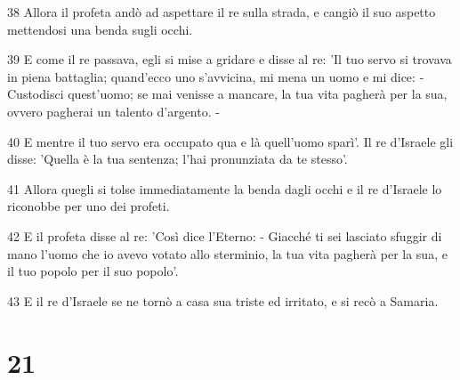 \par 38 Allora il profeta andò ad aspettare il re sulla strada, e cangiò il suo aspetto mettendosi una benda sugli occhi.
\par 39 E come il re passava, egli si mise a gridare e disse al re: 'Il tuo servo si trovava in piena battaglia; quand'ecco uno s'avvicina, mi mena un uomo e mi dice: - Custodisci quest'uomo; se mai venisse a mancare, la tua vita pagherà per la sua, ovvero pagherai un talento d'argento. -
\par 40 E mentre il tuo servo era occupato qua e là quell'uomo sparì'. Il re d'Israele gli disse: 'Quella è la tua sentenza; l'hai pronunziata da te stesso'.
\par 41 Allora quegli si tolse immediatamente la benda dagli occhi e il re d'Israele lo riconobbe per uno dei profeti.
\par 42 E il profeta disse al re: 'Così dice l'Eterno: - Giacché ti sei lasciato sfuggir di mano l'uomo che io avevo votato allo sterminio, la tua vita pagherà per la sua, e il tuo popolo per il suo popolo'.
\par 43 E il re d'Israele se ne tornò a casa sua triste ed irritato, e si recò a Samaria.

\chapter{21}


